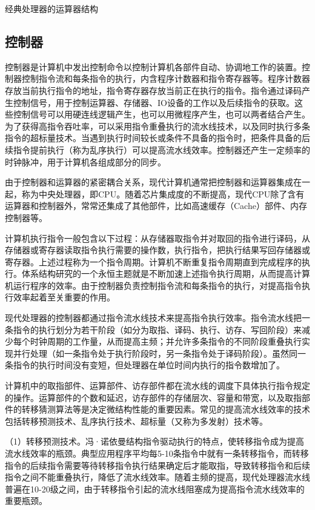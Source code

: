 \documentclass[]{ctexbook}
\begin{document}
\label{tab:alu}经典处理器的运算器结构

\hypertarget{ux63a7ux5236ux5668}{%
\subsection{控制器}\label{ux63a7ux5236ux5668}}

控制器是计算机中发出控制命令以控制计算机各部件自动、协调地工作的装置。控制器控制指令流和每条指令的执行，内含程序计数器和指令寄存器等。程序计数器存放当前执行指令的地址，指令寄存器存放当前正在执行的指令。指令通过译码产生控制信号，用于控制运算器、存储器、IO设备的工作以及后续指令的获取。这些控制信号可以用硬连线逻辑产生，也可以用微程序产生，也可以两者结合产生。为了获得高指令吞吐率，可以采用指令重叠执行的流水线技术，以及同时执行多条指令的超标量技术。当遇到执行时间较长或条件不具备的指令时，把条件具备的后续指令提前执行（称为乱序执行）可以提高流水线效率。控制器还产生一定频率的时钟脉冲，用于计算机各组成部分的同步。

由于控制器和运算器的紧密耦合关系，现代计算机通常把控制器和运算器集成在一起，称为中央处理器，即CPU。随着芯片集成度的不断提高，现代CPU除了含有运算器和控制器外，常常还集成了其他部件，比如高速缓存（Cache）部件、内存控制器等。

计算机执行指令一般包含以下过程：从存储器取指令并对取回的指令进行译码，从存储器或寄存器读取指令执行需要的操作数，执行指令，把执行结果写回存储器或寄存器。上述过程称为一个指令周期。计算机不断重复指令周期直到完成程序的执行。体系结构研究的一个永恒主题就是不断加速上述指令执行周期，从而提高计算机运行程序的效率。由于控制器负责控制指令流和每条指令的执行，对提高指令执行效率起着至关重要的作用。

现代处理器的控制器都通过指令流水线技术来提高指令执行效率。指令流水线把一条指令的执行划分为若干阶段（如分为取指、译码、执行、访存、写回阶段）来减少每个时钟周期的工作量，从而提高主频；并允许多条指令的不同阶段重叠执行实现并行处理（如一条指令处于执行阶段时，另一条指令处于译码阶段）。虽然同一条指令的执行时间没有变短，但处理器在单位时间内执行的指令数增加了。

计算机中的取指部件、运算部件、访存部件都在流水线的调度下具体执行指令规定的操作。运算部件的个数和延迟，访存部件的存储层次、容量和带宽，以及取指部件的转移猜测算法等是决定微结构性能的重要因素。常见的提高流水线效率的技术包括转移预测技术、乱序执行技术、超标量（又称为多发射）技术等。

（1）转移预测技术。冯·诺依曼结构指令驱动执行的特点，使转移指令成为提高流水线效率的瓶颈。典型应用程序平均每5-10条指令中就有一条转移指令，而转移指令的后续指令需要等待转移指令执行结果确定后才能取指，导致转移指令和后续指令之间不能重叠执行，降低了流水线效率。随着主频的提高，现代处理器流水线普遍在10-20级之间，由于转移指令引起的流水线阻塞成为提高指令流水线效率的重要瓶颈。
\end{document}
